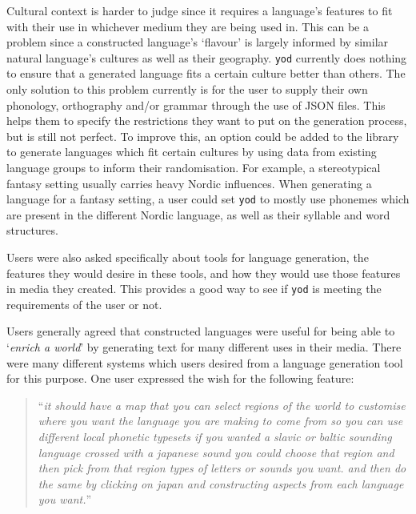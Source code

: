 \documentclass{report}
\begin{document}
	Cultural context is harder to judge since it requires a language's features to fit with their use in whichever medium they are being used in. This can be a problem since a constructed language's `flavour' is largely informed by similar natural language's cultures as well as their geography. \texttt{yod} currently does nothing to ensure that a generated language fits a certain culture better than others. The only solution to this problem currently is for the user to supply their own phonology, orthography and/or grammar through the use of JSON files. This helps them to specify the restrictions they want to put on the generation process, but is still not perfect. To improve this, an option could be added to the library to generate languages which fit certain cultures by using data from existing language groups to inform their randomisation. For example, a stereotypical fantasy setting usually carries heavy Nordic influences. When generating a language for a fantasy setting, a user could set \texttt{yod} to mostly use phonemes which are present in the different Nordic language, as well as their syllable and word structures.
	
	Users were also asked specifically about tools for language generation, the features they would desire in these tools, and how they would use those features in media they created. This provides a good way to see if \texttt{yod} is meeting the requirements of the user or not.
	
	Users generally agreed that constructed languages were useful for being able to `\textit{enrich a world}' by generating text for many different uses in their media. There were many different systems which users desired from a language generation tool for this purpose. One user expressed the wish for the following feature:
	
	\begin{quote}
		``\textit{it should have a map that you can select regions of the world to customise where you want the language you are making to come from so you can use different local phonetic typesets if you wanted a slavic or baltic sounding language crossed with a japanese sound you could choose that region and then pick from that region types of letters or sounds you want. and then do the same by clicking on japan and constructing aspects from each language you want.}''
	\end{quote}
\end{document}
